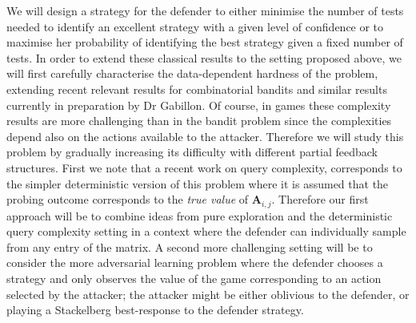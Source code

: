  We will design a strategy for the defender to either minimise the number of tests needed to identify an excellent strategy with a given level of confidence\cite{Maron93HR,Even-Dar06AE} or to maximise her probability of identifying the best strategy given a fixed number of tests\cite{Bubeck09PE,Audibert10BA}. 
 In order to extend these  classical results to the setting proposed above, we will first carefully characterise the data-dependent hardness of the problem, extending recent relevant results for combinatorial bandits\cite{chen2014combinatorial} and similar results currently in preparation by Dr Gabillon.  Of course, in games these complexity results are more challenging than in the bandit problem since the complexities depend also on the actions available to the attacker.
  Therefore we will study this problem by gradually increasing its difficulty with different partial feedback structures. First we note that a recent work\cite{goldberg2014query} on query complexity, corresponds to the simpler deterministic  version of this problem where it is assumed that the probing outcome corresponds to the {\em true value} of $\boldsymbol A_{i,j}$. %
Therefore our first approach will be to combine ideas from pure exploration and the deterministic query complexity setting in a context where the defender can individually sample from any entry of the matrix. A second more challenging setting will be to consider the more adversarial learning problem where the defender chooses a strategy and only observes the value of the game corresponding to an action selected by the attacker; the attacker might be either oblivious to the defender, or playing a Stackelberg best-response to the defender strategy.

